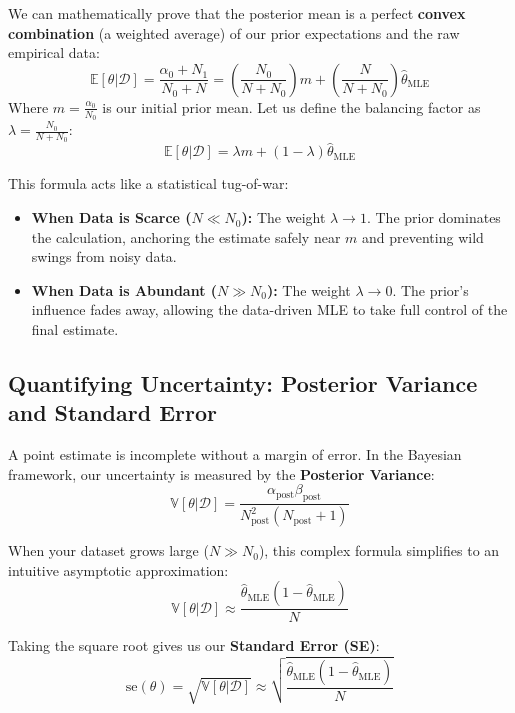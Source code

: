 \documentclass{article}
\begin{document}
We can mathematically prove that the posterior mean is a perfect \textbf{convex combination} (a weighted average) of our prior expectations and the raw empirical data:
\begin{equation}
\mathbb{E}[\theta|\mathcal{D}] = \frac{\alpha_0 + N_1}{N_0 + N} = \left(\frac{N_0}{N + N_0}\right)m + \left(\frac{N}{N + N_0}\right)\hat{\theta}_{\text{MLE}}
\end{equation}
Where $m = \frac{\alpha_0}{N_0}$ is our initial prior mean. Let us define the balancing factor as $\lambda = \frac{N_0}{N + N_0}$:
\begin{equation}
\mathbb{E}[\theta|\mathcal{D}] = \lambda m + (1 - \lambda)\hat{\theta}_{\text{MLE}}
\end{equation}

This formula acts like a statistical tug-of-war:
\begin{itemize}
    \item \textbf{When Data is Scarce ($N \ll N_0$):} The weight $\lambda \to 1$. The prior dominates the calculation, anchoring the estimate safely near $m$ and preventing wild swings from noisy data.
    \item \textbf{When Data is Abundant ($N \gg N_0$):} The weight $\lambda \to 0$. The prior's influence fades away, allowing the data-driven MLE to take full control of the final estimate.
\end{itemize}

\subsection{Quantifying Uncertainty: Posterior Variance and Standard Error}
A point estimate is incomplete without a margin of error. In the Bayesian framework, our uncertainty is measured by the \textbf{Posterior Variance}:
\begin{equation}
\mathbb{V}[\theta|\mathcal{D}] = \frac{\alpha_{\text{post}}\beta_{\text{post}}}{N_{\text{post}}^2(N_{\text{post}} + 1)}
\end{equation}

When your dataset grows large ($N \gg N_0$), this complex formula simplifies to an intuitive asymptotic approximation:
\begin{equation}
\mathbb{V}[\theta|\mathcal{D}] \approx \frac{\hat{\theta}_{\text{MLE}}(1 - \hat{\theta}_{\text{MLE}})}{N}
\end{equation}

Taking the square root gives us our \textbf{Standard Error (SE)}:
\begin{equation}
\text{se}(\theta) = \sqrt{\mathbb{V}[\theta|\mathcal{D}]} \approx \sqrt{\frac{\hat{\theta}_{\text{MLE}}(1 - \hat{\theta}_{\text{MLE}})}{N}}
\end{equation}
\end{document}
